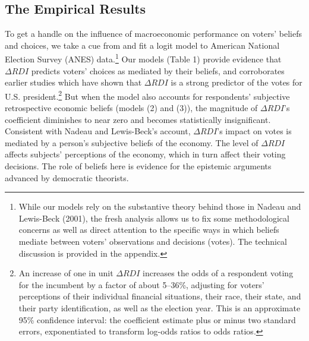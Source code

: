 \documentclass[11pt]{article}
\begin{document}
\subsection{The Empirical Results}\label{sec:model}
To get a handle on the influence of macroeconomic performance on voters' beliefs and choices, we take a cue from \citet{Nadeau:2001tw} and fit a logit model to American National Election Survey (ANES) data.\footnote{While
our models rely on the substantive theory behind those in Nadeau and Lewis-Beck (2001), the fresh analysis allows us to fix some methodological concerns as well as direct attention to the specific ways in which beliefs mediate between voters' observations and decisions (votes). The technical discussion is provided in the appendix.} Our models (Table 1) provide evidence that $\Delta RDI$ predicts voters' choices as mediated by their beliefs, and corroborates earlier studies which have shown that $\Delta RDI$  is a strong predictor of the votes for U.S. president.\footnote{An increase of one in unit $\Delta RDI$ increases the odds of a respondent voting for the incumbent by a factor of about 5--36\%, adjusting for voters' perceptions of their individual financial situations, their race, their state, and their party identification, as well as the election year. This is an approximate 95\% confidence interval: the coefficient estimate plus or minus two standard errors, exponentiated to transform log-odds ratios to odds ratios.} But when the model also accounts for respondents' subjective retrospective economic beliefs (models (2) and (3)), the magnitude of $\Delta RDI$'s coefficient diminishes to near zero and becomes statistically insignificant. Consistent with Nadeau and Lewis-Beck's account, $\Delta RDI$'s impact on votes is mediated by a person's subjective beliefs of the economy. The level of $\Delta RDI$ affects subjects' perceptions of the economy, which in turn affect their voting decisions. The role of beliefs here is evidence for the epistemic arguments advanced by democratic theorists. %
\end{document}
